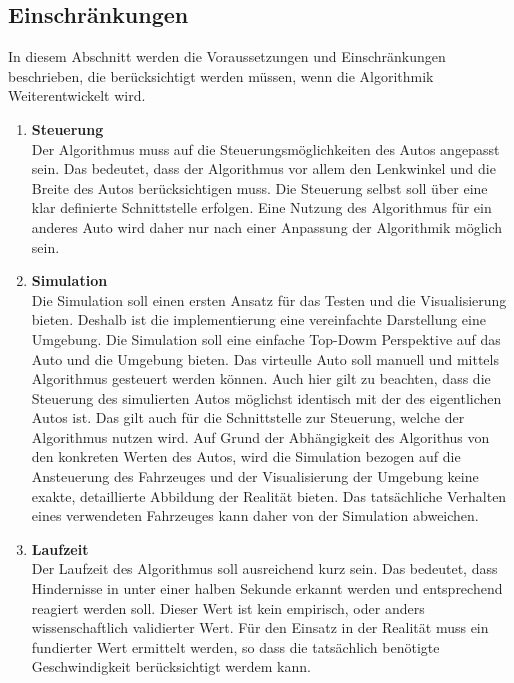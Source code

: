\subsection{Einschränkungen}
In diesem Abschnitt werden die Voraussetzungen und Einschränkungen beschrieben, 
die berücksichtigt werden müssen, wenn die Algorithmik Weiterentwickelt wird.
\begin{enumerate}[leftmargin=*]
    \item \textbf{Steuerung} \\
    Der Algorithmus muss auf die Steuerungsmöglichkeiten des Autos ange\-passt sein.
    Das bedeutet, dass der Algorithmus vor allem den Lenkwin\-kel und die Breite des Autos berücksichtigen muss.
    Die Steuerung selbst soll über eine klar definierte Schnittstelle erfolgen.
    Eine Nutzung des Algorithmus für ein anderes Auto wird daher nur nach einer Anpassung der Algorithmik möglich sein.

    \item \textbf{Simulation} \\
    Die Simulation soll einen ersten Ansatz für das Testen und die Visualisierung bieten. 
    Deshalb ist die implementierung eine vereinfachte Darstellung eine Umgebung.
    Die Simulation soll eine einfache Top-Dowm Perspektive auf das Auto und die Umgebung bieten. 
    Das virteulle Auto soll manuell und mittels Algorithmus gesteuert werden können.
    Auch hier gilt zu beachten, dass die Steuerung des simulierten Autos möglichst identisch mit der des eigentlichen Autos ist.
    Das gilt auch für die Schnittstelle zur Steuerung, welche der Algorithmus nutzen wird.
    Auf Grund der Abhängigkeit des Algorithus von den konkreten Werten des Autos, 
    wird die Simulation bezogen auf die Ansteuerung des Fahrzeuges und der Visualisierung der Umgebung 
    keine exakte, detaillierte Abbildung der Realität bieten. Das tatsächliche Verhalten eines verwendeten Fahrzeuges 
    kann daher von der Simulation abweichen. 

    \item \textbf{Laufzeit} \\
    Der Laufzeit des Algorithmus soll ausreichend kurz sein.
    Das bedeutet, dass Hindernisse in unter einer halben Sekunde erkannt werden und entsprech\-end reagiert werden soll.
    Dieser Wert ist kein empirisch, oder anders wissenschaftlich validierter Wert. 
    Für den Einsatz in der Realität muss ein fundierter Wert ermittelt werden, 
    so dass die tatsächlich benötigte Geschwindigkeit berücksichtigt werdem kann.
\end{enumerate}

\newpage